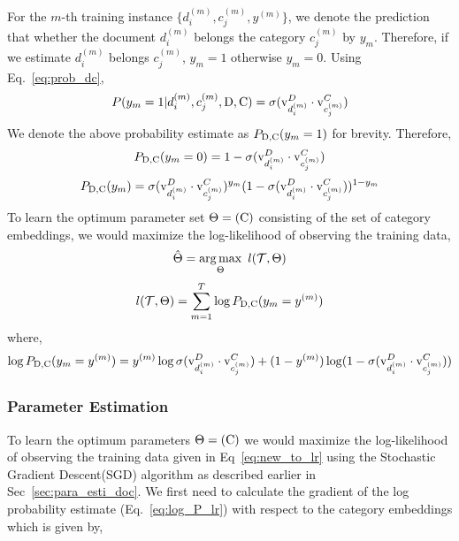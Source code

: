 For the $m$-th training instance $\{ d^{(m)}_{i}, c^{(m)}_{j}, y^{(m)}\}$, we denote the prediction that whether the document $d^{(m)}_{i}$ belongs the category $c^{(m)}_{j}$ by $y_{m}$. Therefore, if we estimate $d^{(m)}_{i}$ belongs $c^{(m)}_{j}$, $y_{m} = 1$ otherwise $y_{m} = 0$. Using Eq.~\ref{eq:prob_dc},
\begin{equation}
\label{eq:prob_trm}
P(y_{m}=1|d^{(m)}_{i}, c^{(m)}_{j}, \mathrm{D}, \mathrm{C}) = \sigma(\mathrm{v}^{D}_{d^{(m)}_{i}}\cdot \mathrm{v}^{C}_{c^{(m)}_{j}})
\end{equation}
We denote the above probability estimate as $P_{\mathrm{D}, \mathrm{C}}(y_{m} = 1)$ for brevity. Therefore,
\begin{equation}
\label{eq:prob_trm_neg}
P_{\mathrm{D}, \mathrm{C}}(y_{m} = 0) = 1 - \sigma(\mathrm{v}^{D}_{d^{(m)}_{i}}\cdot \mathrm{v}^{C}_{c^{(m)}_{j}})
\end{equation}
\begin{equation}
\label{eq:prob_bernouli}
P_{\mathrm{D}, \mathrm{C}}(y_{m}) = \sigma(\mathrm{v}^{D}_{d^{(m)}_{i}}\cdot \mathrm{v}^{C}_{c^{(m)}_{j}})^{y_{m}}(1 - \sigma(\mathrm{v}^{D}_{d^{(m)}_{i}}\cdot \mathrm{v}^{C}_{c^{(m)}_{j}}))^{1-y_{m}}
\end{equation}
To learn the optimum parameter set $\Theta = (\mathrm{C})$ consisting of the set of category embeddings, we would maximize the log-likelihood of observing the training data,
\begin{equation}
\label{eq:cembed_argmax}
\hat{\Theta} =  \operatorname*{arg\,max}_{\Theta}~l(\mathcal{T}, \Theta)
\end{equation}\begin{equation}
\label{eq:new_to_lr}
l(\mathcal{T}, \Theta) = \sum_{m=1}^{T} \log P_{\mathrm{D}, \mathrm{C}}(y_{m} = y^{(m)})
\end{equation}
where,
\begin{equation}
\label{eq:log_P_lr}
\log P_{\mathrm{D}, \mathrm{C}}(y_{m} = y^{(m)}) = y^{(m)}\log \sigma(\mathrm{v}^{D}_{d^{(m)}_{i}}\cdot \mathrm{v}^{C}_{c^{(m)}_{j}}) + (1 - y^{(m)})\log (1 - \sigma(\mathrm{v}^{D}_{d^{(m)}_{i}}\cdot \mathrm{v}^{C}_{c^{(m)}_{j}}))
\end{equation}

\subsubsection{Parameter Estimation}
To learn the optimum parameters $\Theta=(\mathrm{C})$ we would maximize the log-likelihood of observing the training data given in Eq~\ref{eq:new_to_lr} using the Stochastic Gradient Descent(SGD) algorithm as described earlier in Sec~\ref{sec:para_esti_doc}. We first need to calculate the gradient of the log probability estimate (Eq.~\ref{eq:log_P_lr}) with respect to the category embeddings which is given by,

